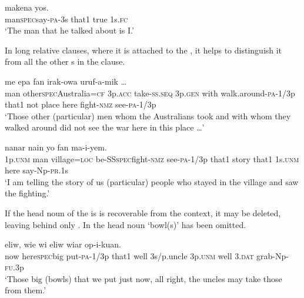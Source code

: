 \ea%
\label{ex:3:x1681}
 makena yos. \\
man\textsc{spec}say-\textsc{pa}-3s that1 true 1s.\textsc{fc}\\
\glt`The man that he talked about is I.'
\z

In long relative clauses, where it is attached to the , it helps to distinguish it from all the other s in the clause. 

\ea%
\label{ex:3:x1815}
\gll [\textstyleEmphasizedVernacularWords{Mua} \textstyleEmphasizedVernacularWords{papako} \textstyleEmphasizedVernacularWords{ena} Australia=ke wia aaw-ep wiena feekiya yiaw-e-mik nain] me epa fan irak-owa uruf-a-mik {\dots}\\
man other\textsc{spec}Australia=\textsc{cf} 3p.\textsc{acc} take-\textsc{ss}.\textsc{seq} 3p.\textsc{gen} with walk.around-\textsc{pa}-1/3p that1 not place here fight-\textsc{nmz} see-\textsc{pa}-1/3p\\
\glt`Those other (particular) men whom the Australians took and with whom they walked around did not see the war here in this place {\dots}'
\z

\ea%
\label{ex:3:x1683}
\gll [\textstyleEmphasizedVernacularWords{I} mua owowa=pa ik-ok \textstyleEmphasizedVernacularWords{ena} irakowa uruf-a-mik nain] nanar nain yo fan ma-i-yem.\\
1p.\textsc{unm} man village=\textsc{loc} be-SS\textsc{spec}fight-\textsc{nmz} see-\textsc{pa}-1/3p that1 story that1 1s.\textsc{unm} here say-Np-\textsc{pr}.1s\\
\glt`I am telling the story of us (particular) people who stayed in the village and saw the fighting.'
\z

If the head noun of the  is is recoverable from the context, it may be deleted, leaving behind only . In  the head noun  `bowl(s)' has been omitted.

\ea%
\label{ex:3:x1682}
 eliw, wie wi eliw wiar op-i-kuan.\\
now here\textsc{spec}big put-\textsc{pa}-1/3p that1 well 3s/p.uncle 3p.\textsc{unm} well 3.\textsc{dat} grab-Np-\textsc{fu}.3p\\
\glt`Those big (bowls) that we put just now, all right, the uncles may take those from them.'
\z

